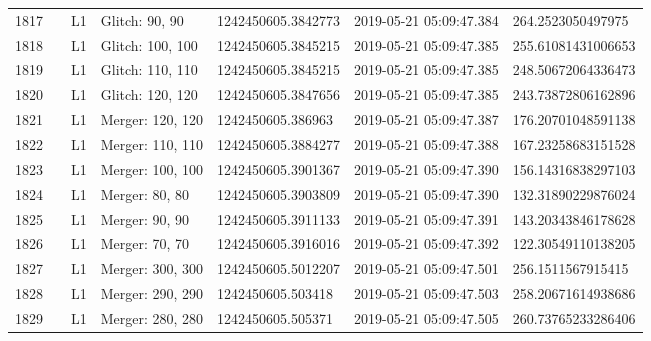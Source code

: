 \begin{longtable}{lllllll}
1817 &                                                    &       L1 &    Glitch: 90, 90 &  1242450605.3842773 &  2019-05-21 05:09:47.384 &   264.2523050497975 \\
1818 &                                                    &       L1 &  Glitch: 100, 100 &  1242450605.3845215 &  2019-05-21 05:09:47.385 &  255.61081431006653 \\
1819 &                                                    &       L1 &  Glitch: 110, 110 &  1242450605.3845215 &  2019-05-21 05:09:47.385 &  248.50672064336473 \\
1820 &                                                    &       L1 &  Glitch: 120, 120 &  1242450605.3847656 &  2019-05-21 05:09:47.385 &  243.73872806162896 \\
1821 &                                                    &       L1 &  Merger: 120, 120 &   1242450605.386963 &  2019-05-21 05:09:47.387 &  176.20701048591138 \\
1822 &                                                    &       L1 &  Merger: 110, 110 &  1242450605.3884277 &  2019-05-21 05:09:47.388 &  167.23258683151528 \\
1823 &                                                    &       L1 &  Merger: 100, 100 &  1242450605.3901367 &  2019-05-21 05:09:47.390 &  156.14316838297103 \\
1824 &                                                    &       L1 &    Merger: 80, 80 &  1242450605.3903809 &  2019-05-21 05:09:47.390 &  132.31890229876024 \\
1825 &                                                    &       L1 &    Merger: 90, 90 &  1242450605.3911133 &  2019-05-21 05:09:47.391 &  143.20343846178628 \\
1826 &                                                    &       L1 &    Merger: 70, 70 &  1242450605.3916016 &  2019-05-21 05:09:47.392 &  122.30549110138205 \\
1827 &                                                    &       L1 &  Merger: 300, 300 &  1242450605.5012207 &  2019-05-21 05:09:47.501 &   256.1511567915415 \\
1828 &                                                    &       L1 &  Merger: 290, 290 &   1242450605.503418 &  2019-05-21 05:09:47.503 &  258.20671614938686 \\
1829 &                                                    &       L1 &  Merger: 280, 280 &   1242450605.505371 &  2019-05-21 05:09:47.505 &  260.73765233286406 \\

\end{longtable}
